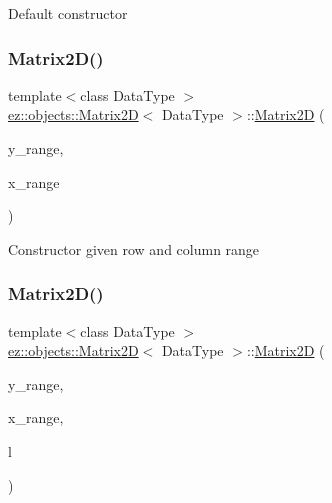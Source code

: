 Default constructor \mbox{\label{classez_1_1objects_1_1Matrix2D_ac3bd803c3d42ae0eeb0bc50d04148d7f}} 
\subsubsection{\texorpdfstring{Matrix2\+D()}{Matrix2D()}\hspace{0.1cm}{\footnotesize\ttfamily [2/4]}}
{\footnotesize\ttfamily template$<$class Data\+Type $>$ \\
\hyperlink{classez_1_1objects_1_1Matrix2D}{ez\+::objects\+::\+Matrix2D}$<$ Data\+Type $>$\+::\hyperlink{classez_1_1objects_1_1Matrix2D}{Matrix2D} (\begin{DoxyParamCaption}\item[{\hyperlink{classez_1_1essential_1_1Range}{ez\+::essential\+::\+Range}}]{y\+\_\+range,  }\item[{\hyperlink{classez_1_1essential_1_1Range}{ez\+::essential\+::\+Range}}]{x\+\_\+range }\end{DoxyParamCaption})\hspace{0.3cm}{\ttfamily [inline]}}

Constructor given row and column range \mbox{\label{classez_1_1objects_1_1Matrix2D_aa8e3f8149bc97efb0a2c45c10520594b}} 
\subsubsection{\texorpdfstring{Matrix2\+D()}{Matrix2D()}\hspace{0.1cm}{\footnotesize\ttfamily [3/4]}}
{\footnotesize\ttfamily template$<$class Data\+Type $>$ \\
\hyperlink{classez_1_1objects_1_1Matrix2D}{ez\+::objects\+::\+Matrix2D}$<$ Data\+Type $>$\+::\hyperlink{classez_1_1objects_1_1Matrix2D}{Matrix2D} (\begin{DoxyParamCaption}\item[{\hyperlink{classez_1_1essential_1_1Range}{ez\+::essential\+::\+Range}}]{y\+\_\+range,  }\item[{\hyperlink{classez_1_1essential_1_1Range}{ez\+::essential\+::\+Range}}]{x\+\_\+range,  }\item[{const std\+::initializer\+\_\+list$<$ Data\+Type $>$ \&}]{l }\end{DoxyParamCaption})\hspace{0.3cm}{\ttfamily [inline]}}

